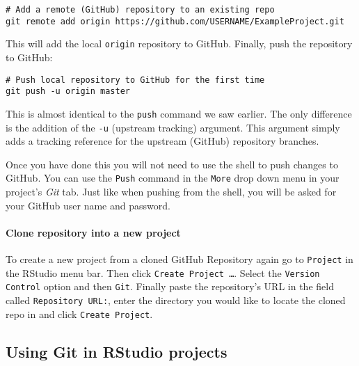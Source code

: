 \begin{knitrout}
\color{fgcolor}\begin{kframe}
\begin{verbatim}
# Add a remote (GitHub) repository to an existing repo
git remote add origin https://github.com/USERNAME/ExampleProject.git
\end{verbatim}
\end{kframe}
\end{knitrout}


\noindent This will add the local \texttt{origin} repository to GitHub. Finally, push the repository to GitHub: 

\begin{knitrout}
\color{fgcolor}\begin{kframe}
\begin{verbatim}
# Push local repository to GitHub for the first time
git push -u origin master
\end{verbatim}
\end{kframe}
\end{knitrout}


\noindent This is almost identical to the \texttt{push} command we saw earlier. The only difference is the addition of the \texttt{-u} (upstream tracking) argument. This argument simply adds a tracking reference for the upstream (GitHub) repository branches. 

Once you have done this you will not need to use the shell to push changes to GitHub. You can use the \texttt{Push} command in the \texttt{More} drop down menu in your project's \emph{Git} tab. Just like when pushing from the shell, you will be asked for your GitHub user name and password.

\paragraph{Clone repository into a new project}

To create a new project from a cloned GitHub Repository again go to \texttt{Project} in the RStudio menu bar. Then click \texttt{Create Project \ldots}. Select the \texttt{Version Control} option and then \texttt{Git}. Finally paste the repository's URL in the field called \texttt{Repository URL:}, enter the directory you would like to locate the cloned repo in and click \texttt{Create Project}. 

\subsection{Using Git in RStudio projects}

